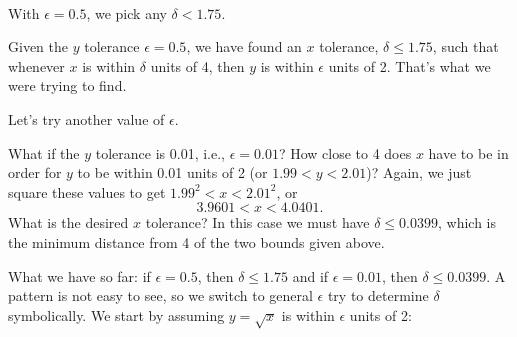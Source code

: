 \begin{example}
{
		\\
		\noindent
		With $\epsilon=0.5$, we pick any $\delta < 1.75$.%
	}

		

Given the $y$ tolerance $\epsilon =0.5$, we have found an $x$ tolerance, $\delta \leq 1.75$, such that whenever $x$ is within $\delta$ units of 4, then $y$ is within $\epsilon$ units of 2.  That's what we were trying to find.\bigskip
  
Let's try another value of $\epsilon$.\bigskip

What if the $y$ tolerance is 0.01, i.e.,  $\epsilon =0.01$?  How close to 4 does $x$ have to be in order for $y$ to be within 0.01 units of 2 (or $1.99 < y < 2.01$)?  Again, we just square these values to get
$1.99^2 < x < 2.01^2$, or 
\[3.9601 < x < 4.0401\text{.}\]
What is the desired $x$ tolerance?  In this case we must have $\delta \leq 0.0399$, which is the minimum distance from 4 of the two bounds given above.  %

What we have so far: if $\epsilon =0.5$, then $\delta \leq 1.75$ and if $\epsilon = 0.01$, then $\delta \leq 0.0399$. A pattern is not easy to see, so we switch to general $\epsilon$ try to determine $\delta$ symbolically.  We start by assuming $y=\sqrt{x}$ is within $\epsilon$ units of 2:


\end{example}
